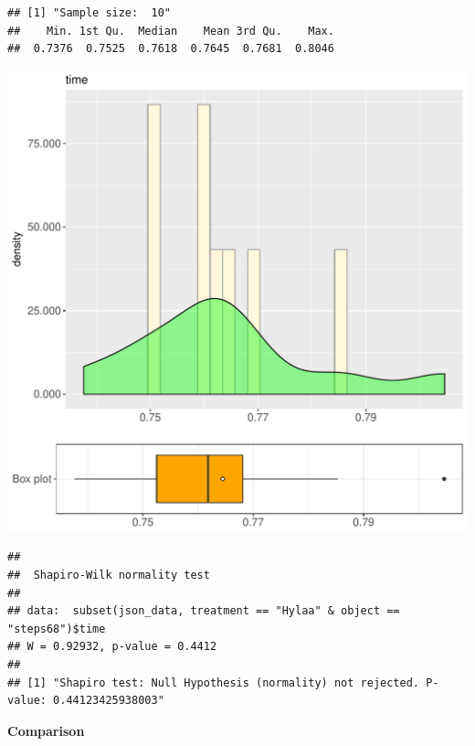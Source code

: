 \documentclass{article}\usepackage[]{graphicx}\usepackage[]{color}
\makeatletter
\def\maxwidth{ %
  \ifdim\Gin@nat@width>\linewidth
    \linewidth
  \else
    \Gin@nat@width
  \fi
}
\newenvironment{kframe}{%
 \def\at@end@of@kframe{}%
 \ifinner\ifhmode%
  \def\at@end@of@kframe{\end{minipage}}%
  \begin{minipage}{\columnwidth}%
 \fi\fi%
 \def\FrameCommand##1{\hskip\@totalleftmargin \hskip-\fboxsep
 \colorbox{shadecolor}{##1}\hskip-\fboxsep
     \hskip-\linewidth \hskip-\@totalleftmargin \hskip\columnwidth}%
 \MakeFramed {\advance\hsize-\width
   \@totalleftmargin\z@ \linewidth\hsize
   \@setminipage}}%
 {\par\unskip\endMakeFramed%
 \at@end@of@kframe}
\newenvironment{knitrout}{}{} %
\makeatother
\begin{document}
\begin{knitrout}
\color{fgcolor}\begin{kframe}
\begin{verbatim}
## [1] "Sample size:  10"
##    Min. 1st Qu.  Median    Mean 3rd Qu.    Max. 
##  0.7376  0.7525  0.7618  0.7645  0.7681  0.8046
\end{verbatim}
\end{kframe}
\includegraphics[width=\maxwidth]{figure/RH2_Hylaa_steps68-1} 
\begin{kframe}\begin{verbatim}
## 
## 	Shapiro-Wilk normality test
## 
## data:  subset(json_data, treatment == "Hylaa" & object == "steps68")$time
## W = 0.92932, p-value = 0.4412
## 
## [1] "Shapiro test: Null Hypothesis (normality) not rejected. P-value: 0.44123425938003"
\end{verbatim}
\end{kframe}
\end{knitrout}
  
 \textbf{Comparison}
  
\end{document}
